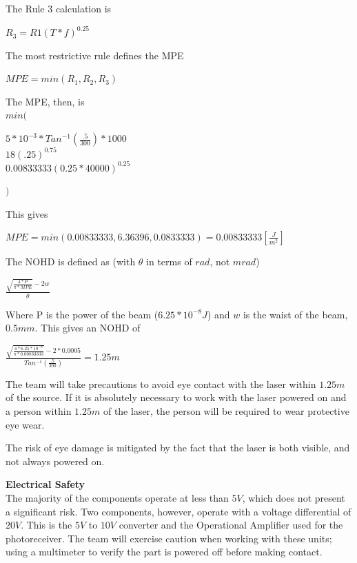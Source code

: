 \documentclass[letterpaper,10pt]{article}
\begin{document}
\begin{spacing}{1.15}
The Rule 3 calculation is
\begin{center}
	\large
	$R_3 = R1(T*f)^{0.25}$
\end{center}

The most restrictive rule defines the MPE 
\begin{center}
	\large
	$MPE = min(R_1, R_2, R_3)$
\end{center}

The MPE, then, is\\
{\large $min($}
\begin{center}
	\large
	$ 5*10^{-3} * Tan^{-1}(\frac{.5}{300})* 1000$\\
	$18 (.25)^{0.75}$ \\
	$0.00833333 (0.25*40000)^{0.25}$
\end{center}
{\large $)$}

This gives 
\begin{center}
	\large
	$MPE = min(0.00833333, 6.36396, 0.0833333) = 0.00833333 [\frac{J}{m^2}]$
\end{center}

The NOHD is defined as (with $\theta$ in terms of $rad$, not $mrad$)
\begin{center}
	\large
$ \frac{\sqrt{\frac{4 * P}{\pi * MPE}} - 2w}{\theta}$
\end{center}

Where P is the power of the beam ($6.25*10^{-8} J$) and $w$ is the waist of the beam, $0.5mm$. This gives an NOHD of 
\begin{center}
	\large
	$ \frac{\sqrt{\frac{4 * 6.25*10^{-8} }{\pi * 0.00833333}} - 2*0.0005}{Tan^{-1}(\frac{.5}{300})} = 1.25 m$
\end{center}

The team will take precautions to avoid eye contact with the laser within $1.25m$ of the source. If it is absolutely necessary to work with the laser powered on and a person within $1.25m$ of the laser, the person will be required to wear protective eye wear. 

The risk of eye damage is mitigated by the fact that the laser is both visible, and not always powered on. 

\normalsize\textbf{Electrical Safety} \\
The majority of the components operate at less than $5V$, which does not present a significant risk. Two components, however, operate with a voltage differential of $20V$. This is the $5V$ to $10V$ converter and the Operational Amplifier used for the photoreceiver. The team will exercise caution when working with these units; using a multimeter to verify the part is powered off before making contact. 


\end{spacing}
\end{document}
